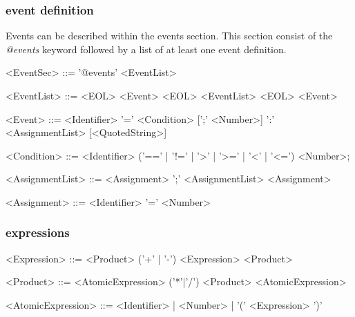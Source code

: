 \documentclass[a4paper]{article}
\begin{document}
\subsubsection*{event definition}
Events can be described within the events section. This section consist of the \emph{@events} keyword followed by a list of at least one event definition. 
\begin{table} [h!]
\begin{grammar}
<EventSec> ::= '@events' <EventList>

<EventList> ::= <EOL> <Event> <EOL> <EventList>
  \alt <EOL> <Event>
  
<Event> ::= <Identifier> '=' <Condition> [';' <Number>] ':' <AssignmentList> [<QuotedString>]

<Condition> ::= <Identifier> ('==' | '!=' | '>' | '>=' | '<' | '<=') <Number>;

<AssignmentList> ::= <Assignment> ';' <AssignmentList>
  \alt <Assignment>
  
<Assignment> ::= <Identifier> '=' <Number>
\end{grammar}
\end{table}


\subsubsection*{expressions}
\begin{table}[h!]
\begin{grammar}
<Expression> ::= <Product> ('+' | '-') <Expression>
 \alt <Product>
 
<Product> ::= <AtomicExpression> ('*'|'/') <Product>
  \alt <AtomicExpression>
  
<AtomicExpression> ::= <Identifier> | <Number> | '(' <Expression> ')'
\end{grammar}
\end{table}
\end{document}
